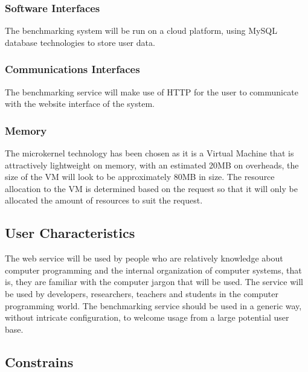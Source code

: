 \documentclass[runningheads,a4paper]{article}
\begin{document}
		\subsubsection{Software Interfaces}
			The benchmarking system will be run on a cloud platform, using MySQL database technologies to store user data. \newline
			
		\subsubsection{Communications Interfaces}
			The benchmarking service will make use of HTTP for the user to communicate with the website interface of the system. \newline
			
		\subsubsection{Memory}
			The microkernel technology has been chosen as it is a Virtual Machine that is attractively lightweight on memory, with an estimated 20MB on overheads, the size of the VM will look to be approximately 80MB in size. The resource allocation to the VM is determined based on the request so that it will only be allocated the amount of resources to suit the request. \newline




\subsection{User Characteristics}
	The web service will be used by people who are relatively knowledge about computer programming and the internal 
	organization of computer systems, that is, they are familiar with the computer jargon that will be used. The service
	will be used by developers, researchers, teachers and students in the computer programming world. The benchmarking
	service should be used in a generic way, without intricate configuration, to welcome usage from a large potential 
	user base.
\subsection{Constrains}


\end{document}
